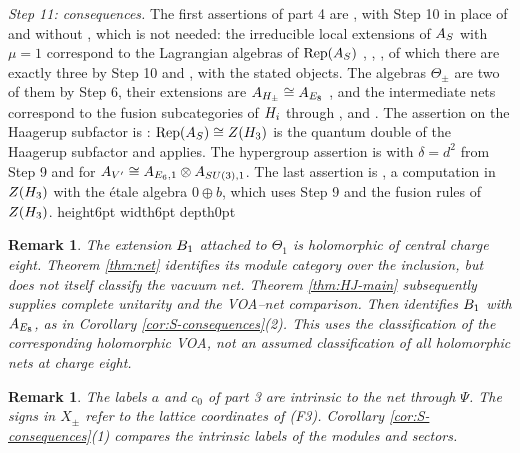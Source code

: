 \documentclass[leqno]{article}
\let\cal\relax
\newcommand{\cal}{\mathcal}
\newcommand{\qed}{\hfill \vrule height6pt  width6pt depth0pt}
\newcommand{\ot}{\otimes}
\DeclareMathOperator{\Rep}{Rep}
\newtheorem{remark}[thm]{Remark}
\numberwithin{equation}{section}
\begin{document}
\emph{Step 11: consequences.} The first assertions of part 4 are \cite[Theorem 7.2(2),(3)]{ArhII}, with Step 10 in place of \cite[Lemma 7.1]{ArhII} and without \cite[Proposition 3.5]{ArhII}, which is not needed: the irreducible local extensions of $\cal A_S$ with $\mu = 1$ correspond to the Lagrangian algebras of $\Rep(\cal A_S)$ \cite[Proposition 2.5(1),(2)]{ArhII}, \cite[Theorem 4.9]{LoR95}, \cite[Theorems 3.2 and 3.9]{CGGH23}, of which there are exactly three by Step 10 and \cite[Proposition 3.3]{ArhII}, with the stated objects. The algebras $\Theta_\pm$ are two of them by Step 6, their extensions are $\cal A_{H_\pm} \cong \cal A_{E_8}$ \cite[Theorem 4.5]{ArhII}, and the intermediate nets correspond to the fusion subcategories of $\cal H_i$ through \cite[Proposition 4.11]{BKLR15}, \cite[Lemma 3.1]{ArhII} and \cite[Theorem 4.10]{DMNO13}. The assertion on the Haagerup subfactor is \cite[Corollary 7.4]{ArhII}: $\Rep(\cal A_S) \cong Z(\cal H_3)$ is the quantum double of the Haagerup subfactor and \cite[Proposition 4.7(1)]{Bis17a} applies. The hypergroup assertion is \cite[Proposition 7.5 and Corollary 7.6]{ArhII} with $\delta = d^2$ from Step 9 and \cite[Proposition 4.3(2)]{ArhII} for $\cal A_{V'} \cong \cal A_{E_6,1} \ot \cal A_{SU(3),1}$. The last assertion is \cite[Remark 7.8]{ArhII}, a computation in $Z(\cal H_3)$ with the étale algebra $0 \oplus b$, which uses Step 9 and the fusion rules of $Z(\cal H_3)$.
\qed

\begin{remark}\normalfont
\label{rem:third-extension}
The extension $\cal B_1$ attached to $\Theta_1$ is holomorphic of central charge eight. Theorem \ref{thm:net} identifies its module category over the inclusion, but does not itself classify the vacuum net. Theorem \ref{thm:HJ-main} subsequently supplies complete unitarity and the VOA--net comparison. Then \cite[Proposition 7.10]{ArhII} identifies $\cal B_1$ with $\cal A_{E_8}$, as in Corollary \ref{cor:S-consequences}(2). This uses the classification of the corresponding holomorphic VOA, not an assumed classification of all holomorphic nets at charge eight.
\end{remark}

\begin{remark}\normalfont
\label{rem:net-labels}
The labels $a$ and $c_0$ of part 3 are intrinsic to the net through $\Psi$. The signs in $X_\pm$ refer to the lattice coordinates of (F3). Corollary \ref{cor:S-consequences}(1) compares the intrinsic labels of the modules and sectors.
\end{remark}
\end{document}
